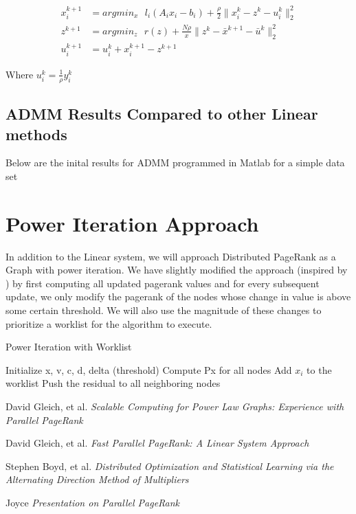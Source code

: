 \documentclass[a4paper,10pt]{article}
\begin{document}
\begin{center}
\begin{align}
	x_{i}^{k+1} &= argmin_{x} \: \: \: l_{i}(A_{i}x_{i} - b_{i}) + \frac{\rho}{2} \| x_{i}^{k} - z^{k} - u_{i}^{k} \|_{2}^{2} \\
	z^{k+1} &= argmin_{z} \: \: \: r(z) + \frac{N \rho}{x} \| z^{k} - \bar{x}^{k+1} - \bar{u}^{k} \|_{2}^{2} \\
	u_{i}^{k+1} &= u_{i}^{k} + x_{i}^{k+1} - z^{k+1}  
\end{align}
\end{center}
Where $u_{i}^{k} = \frac{1}{\rho} y_{i}^{k}$



\subsection{ADMM Results Compared to other Linear methods}
Below are the inital results for ADMM programmed in Matlab for a simple data set


\newpage
\section{Power Iteration Approach}
In addition to the Linear system, we will approach Distributed PageRank as a Graph with power iteration. We have slightly modified the approach (inspired by \cite{Joyce}) by first computing all updated pagerank values and for every subsequent update, we only modify the pagerank of the nodes whose change in value is above some certain threshold. We will also use the magnitude of these changes to prioritize a worklist for the algorithm to execute. 
\newline
\begin{algorithm}
\caption{Power Iteration with Worklist}
\begin{algorithmic}[1]
  \STATE Initialize x, v, c, d, delta (threshold)
  \STATE Compute Px for all nodes
	\STATE Add $x_{i}$ to the worklist
	\STATE Push the residual to all neighboring nodes
  \ENDIF
  \ENDWHILE
\end{algorithmic}
\end{algorithm}
\newline


\begin{thebibliography}{1}

 David Gleich, et al. {\em Scalable Computing for Power Law Graphs: Experience with Parallel PageRank}

 David Gleich, et al. {\em Fast Parallel PageRank: A Linear System Approach} 

 Stephen Boyd, et al. {\em Distributed Optimization and Statistical Learning via the Alternating Direction Method of Multipliers} 

 Joyce {\em Presentation on Parallel PageRank}
  
\end{thebibliography}
\end{document}

